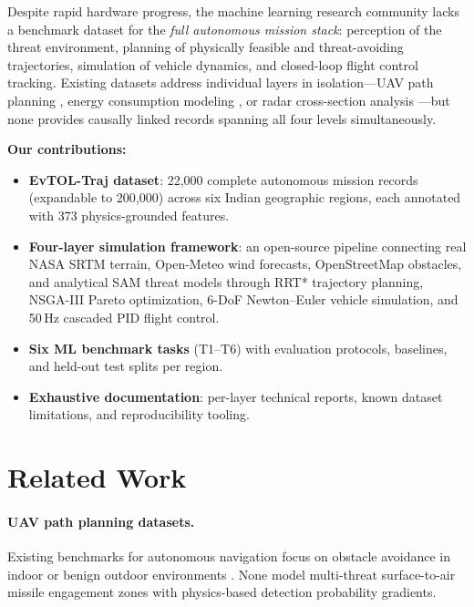 \documentclass{article}
\begin{document}
Despite rapid hardware progress, the machine learning research community
lacks a benchmark dataset for the \emph{full autonomous mission stack}:
perception of the threat environment, planning of physically feasible and
threat-avoiding trajectories, simulation of vehicle dynamics, and closed-loop
flight control tracking.
Existing datasets address individual layers in isolation---UAV path planning
\citep{ong2021uav}, energy consumption modeling \citep{rodrigues2021energy},
or radar cross-section analysis \citep{skolnik2008radar}---but none provides
causally linked records spanning all four levels simultaneously.

\textbf{Our contributions:}
\begin{itemize}
  \item \textbf{EvTOL-Traj dataset}: 22{,}000 complete autonomous mission
    records (expandable to 200{,}000) across six Indian geographic regions,
    each annotated with 373 physics-grounded features.
  \item \textbf{Four-layer simulation framework}: an open-source pipeline
    connecting real NASA SRTM terrain, Open-Meteo wind forecasts, OpenStreetMap
    obstacles, and analytical SAM threat models through RRT*
    \citep{karaman2011sampling} trajectory planning, NSGA-III
    \citep{deb2014evolutionary} Pareto optimization, 6-DoF Newton--Euler
    vehicle simulation, and 50\,Hz cascaded PID flight control.
  \item \textbf{Six ML benchmark tasks} (T1--T6) with evaluation protocols,
    baselines, and held-out test splits per region.
  \item \textbf{Exhaustive documentation}: per-layer technical reports,
    known dataset limitations, and reproducibility tooling.
\end{itemize}

\section{Related Work}
\label{sec:related}

\paragraph{UAV path planning datasets.}
Existing benchmarks for autonomous navigation focus on obstacle avoidance
in indoor or benign outdoor environments \citep{ong2021uav,sun2022motion}.
None model multi-threat surface-to-air missile engagement zones with
physics-based detection probability gradients.
\end{document}
